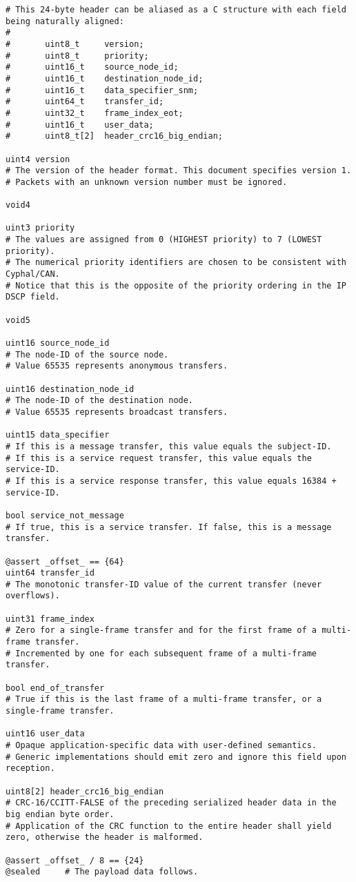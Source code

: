 \begin{samepage}
\begin{verbatim}
# This 24-byte header can be aliased as a C structure with each field being naturally aligned:
#
#       uint8_t     version;
#       uint8_t     priority;
#       uint16_t    source_node_id;
#       uint16_t    destination_node_id;
#       uint16_t    data_specifier_snm;
#       uint64_t    transfer_id;
#       uint32_t    frame_index_eot;
#       uint16_t    user_data;
#       uint8_t[2]  header_crc16_big_endian;

uint4 version
# The version of the header format. This document specifies version 1.
# Packets with an unknown version number must be ignored.

void4

uint3 priority
# The values are assigned from 0 (HIGHEST priority) to 7 (LOWEST priority).
# The numerical priority identifiers are chosen to be consistent with Cyphal/CAN.
# Notice that this is the opposite of the priority ordering in the IP DSCP field.

void5

uint16 source_node_id
# The node-ID of the source node.
# Value 65535 represents anonymous transfers.

uint16 destination_node_id
# The node-ID of the destination node.
# Value 65535 represents broadcast transfers.

uint15 data_specifier
# If this is a message transfer, this value equals the subject-ID.
# If this is a service request transfer, this value equals the service-ID.
# If this is a service response transfer, this value equals 16384 + service-ID.

bool service_not_message
# If true, this is a service transfer. If false, this is a message transfer.

@assert _offset_ == {64}
uint64 transfer_id
# The monotonic transfer-ID value of the current transfer (never overflows).

uint31 frame_index
# Zero for a single-frame transfer and for the first frame of a multi-frame transfer.
# Incremented by one for each subsequent frame of a multi-frame transfer.

bool end_of_transfer
# True if this is the last frame of a multi-frame transfer, or a single-frame transfer.

uint16 user_data
# Opaque application-specific data with user-defined semantics.
# Generic implementations should emit zero and ignore this field upon reception.

uint8[2] header_crc16_big_endian
# CRC-16/CCITT-FALSE of the preceding serialized header data in the big endian byte order.
# Application of the CRC function to the entire header shall yield zero, otherwise the header is malformed.

@assert _offset_ / 8 == {24}
@sealed     # The payload data follows.
\end{verbatim}
\end{samepage}

